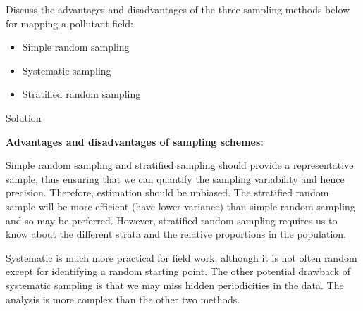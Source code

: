 \documentclass[
  letterpaper,
  DIV=11,
  numbers=noendperiod,
  oneside]{scrartcl}
\providecommand{\tightlist}{%
  \setlength{\itemsep}{0pt}\setlength{\parskip}{0pt}}\usepackage{longtable,booktabs,array}
\begin{document}
\begin{tcolorbox}[enhanced jigsaw, bottomrule=.15mm, breakable, bottomtitle=1mm, colback=white, titlerule=0mm, colbacktitle=quarto-callout-tip-color!10!white, rightrule=.15mm, toptitle=1mm, left=2mm, opacityback=0, toprule=.15mm, arc=.35mm, title={Task 9}, colframe=quarto-callout-tip-color-frame, coltitle=black, leftrule=.75mm, opacitybacktitle=0.6]

Discuss the advantages and disadvantages of the three sampling methods
below for mapping a pollutant field:

\begin{itemize}
\tightlist
\item
  Simple random sampling
\item
  Systematic sampling
\item
  Stratified random sampling
\end{itemize}

Solution

\textbf{Advantages and disadvantages of sampling schemes:}

Simple random sampling and stratified sampling should provide a
representative sample, thus ensuring that we can quantify the sampling
variability and hence precision. Therefore, estimation should be
unbiased. The stratified random sample will be more efficient (have
lower variance) than simple random sampling and so may be preferred.
However, stratified random sampling requires us to know about the
different strata and the relative proportions in the population.

Systematic is much more practical for field work, although it is not
often random except for identifying a random starting point. The other
potential drawback of systematic sampling is that we may miss hidden
periodicities in the data. The analysis is more complex than the other
two methods.

\end{tcolorbox}
\end{document}
